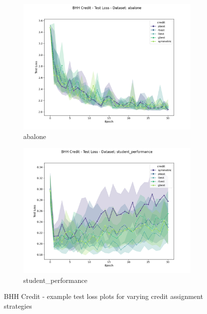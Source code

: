 \begin{figure}[htbp]
	\begin{subfigure}{0.5\textwidth}
    	\centering
        \includegraphics[width=\textwidth]{analysis/bhh_credit/figures/test/loss/abalone.png}
        \caption{abalone}
        \label{fig:results:credit:figures:loss1}
	\end{subfigure}
		\begin{subfigure}{0.5\textwidth}
    	\centering
        \includegraphics[width=\textwidth]{analysis/bhh_credit/figures/test/loss/student_performance.png}
        \caption{student\_performance}
        \label{fig:results:credit:figures:loss2}
	\end{subfigure}
	\caption{\Acs{BHH} Credit - example test loss plots for varying credit assignment strategies}
	\label{fig:results:credit:figures:loss}
\end{figure}


